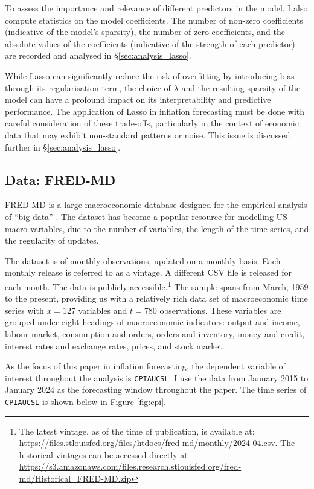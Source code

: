 To assess the importance and relevance of different predictors in the model, I also compute statistics on the model coefficients. The number of non-zero coefficients (indicative of the model's sparsity), the number of zero coefficients, and the absolute values of the coefficients (indicative of the strength of each predictor) are recorded and analysed in \S \ref{sec:analysis_lasso}.

While Lasso can significantly reduce the risk of overfitting by introducing bias through its regularisation term, the choice of $\lambda$ and the resulting sparsity of the model can have a profound impact on its interpretability and predictive performance. The application of Lasso in inflation forecasting must be done with careful consideration of these trade-offs, particularly in the context of economic data that may exhibit non-standard patterns or noise. This issue is discussed further in \S \ref{sec:analysis_lasso}.



\subsection{Data: FRED-MD} \label{sec:methods_data}

FRED-MD is a large macroeconomic database designed for the empirical analysis of “big data” \autocite{McCracken2016FRED-MD:Research}. The dataset has become a popular resource for modelling US macro variables, due to the number of variables, the length of the time series, and the regularity of updates.

The dataset is of monthly observations, updated on a monthly basis. Each monthly release is referred to as a vintage. A different CSV file is released for each month. The data is publicly accessible.\footnote{The latest vintage, as of the time of publication, is available at: \url{https://files.stlouisfed.org/files/htdocs/fred-md/monthly/2024-04.csv}. The historical vintages can be accessed directly at \url{https://s3.amazonaws.com/files.research.stlouisfed.org/fred-md/Historical_FRED-MD.zip}
} The sample spans from March, 1959 to the present, providing us with a relatively rich data set of macroeconomic time series with $x = 127$ variables and $t = 780$ observations. These variables are grouped under eight headings of macroeconomic indicators: output and income, labour market, consumption and orders, orders and inventory, money and credit, interest rates and exchange rates, prices, and stock market.

As the focus of this paper in inflation forecasting, the dependent variable of interest throughout the analysis is \texttt{CPIAUCSL}. I use the data from January 2015 to January 2024 as the forecasting window throughout the paper. The time series of \texttt{CPIAUCSL} is shown below in Figure \ref{fig:cpi}.

